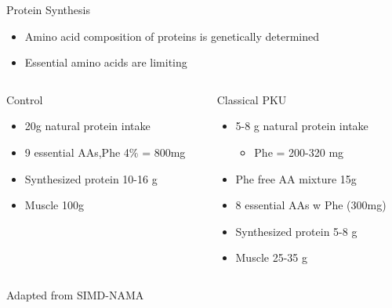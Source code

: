 \documentclass[presentation, smaller]{beamer}
\begin{document}
\begin{frame}[label={sec:orgheadline11}]{Protein Synthesis}
\begin{itemize}
\item Amino acid composition of proteins is genetically determined
\item Essential amino acids are limiting
\end{itemize}
\begin{columns}
\begin{column}{0.45\columnwidth}
\begin{block}{Control}
\begin{itemize}
\item 20g natural protein intake
\item 9 essential AAs,Phe 4\% = 800mg
\item Synthesized protein 10-16 g
\item Muscle 100g
\end{itemize}
\end{block}
\end{column}
\begin{column}{0.45\columnwidth}
\begin{block}{Classical PKU}
\begin{itemize}
\item 5-8 g natural protein intake
\begin{itemize}
\item Phe = 200-320 mg
\end{itemize}
\item Phe free AA mixture 15g
\item 8 essential AAs w Phe (300mg)
\item Synthesized protein 5-8 g
\item Muscle 25-35 g
\end{itemize}
\end{block}
\end{column}
\end{columns}
\begin{flushright}
\tiny{Adapted from SIMD-NAMA}
\end{flushright}
\end{frame}
\end{document}
